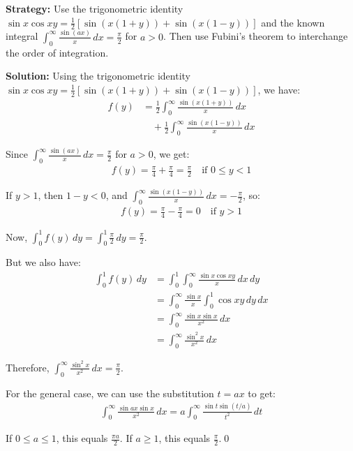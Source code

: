 \noindent\textbf{Strategy:} Use the trigonometric identity $\sin x \cos xy = \frac{1}{2}[\sin(x(1+y)) + \sin(x(1-y))]$ and the known integral $\int_0^{\infty} \frac{\sin(ax)}{x} \, dx = \frac{\pi}{2}$ for $a > 0$. Then use Fubini's theorem to interchange the order of integration.

\bigskip\noindent\textbf{Solution:}
Using the trigonometric identity $\sin x \cos xy = \frac{1}{2}[\sin(x(1+y)) + \sin(x(1-y))]$, we have:
\begin{align*}
f(y) &= \frac{1}{2} \int_{0}^{\infty} \frac{\sin(x(1+y))}{x} \, dx \\
&\quad + \frac{1}{2} \int_{0}^{\infty} \frac{\sin(x(1-y))}{x} \, dx
\end{align*}

Since $\int_{0}^{\infty} \frac{\sin(ax)}{x} \, dx = \frac{\pi}{2}$ for $a > 0$, we get:
\begin{align*}
f(y) = \frac{\pi}{4} + \frac{\pi}{4} = \frac{\pi}{2} \quad \text{if } 0 \leq y < 1
\end{align*}

If $y > 1$, then $1-y < 0$, and $\int_{0}^{\infty} \frac{\sin(x(1-y))}{x} \, dx = -\frac{\pi}{2}$, so:
\begin{align*}
f(y) = \frac{\pi}{4} - \frac{\pi}{4} = 0 \quad \text{if } y > 1
\end{align*}

Now, $\int_{0}^{1} f(y) \, dy = \int_{0}^{1} \frac{\pi}{2} \, dy = \frac{\pi}{2}$.

But we also have:
\begin{align*}
\int_{0}^{1} f(y) \, dy &= \int_{0}^{1} \int_{0}^{\infty} \frac{\sin x \cos xy}{x} \, dx \, dy \\
&= \int_{0}^{\infty} \frac{\sin x}{x} \int_{0}^{1} \cos xy \, dy \, dx \\
&= \int_{0}^{\infty} \frac{\sin x \sin x}{x^2} \, dx \\
&= \int_{0}^{\infty} \frac{\sin^2 x}{x^2} \, dx
\end{align*}

Therefore, $\int_{0}^{\infty} \frac{\sin^2 x}{x^2} \, dx = \frac{\pi}{2}$.

For the general case, we can use the substitution $t = ax$ to get:
\begin{align*}
\int_{0}^{\infty} \frac{\sin ax \sin x}{x^2} \, dx = a \int_{0}^{\infty} \frac{\sin t \sin(t/a)}{t^2} \, dt
\end{align*}

If $0 \leq a \leq 1$, this equals $\frac{\pi a}{2}$. If $a \geq 1$, this equals $\frac{\pi}{2}$.\qed


